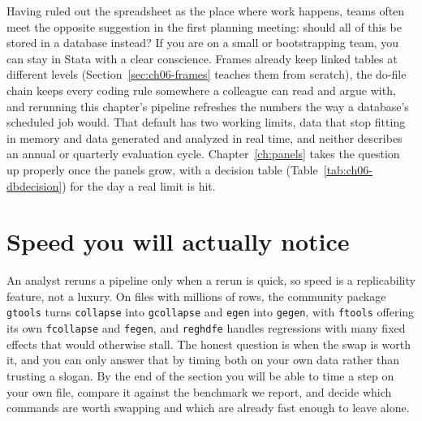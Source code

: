 \documentclass[
    a4paper,
    fontsize=10pt,
    twoside=true,
    numbers=noenddot,
]{kaobook}
\begin{document}
Having ruled out the spreadsheet as the place where work happens, teams often meet the opposite suggestion in the first planning meeting: should all of this be stored in a database instead? If you are on a small or bootstrapping team, you can stay in Stata with a clear conscience. Frames already keep linked tables at different levels (Section~\ref{sec:ch06-frames} teaches them from scratch), the do-file chain keeps every coding rule somewhere a colleague can read and argue with, and rerunning this chapter's pipeline refreshes the numbers the way a database's scheduled job would. That default has two working limits, data that stop fitting in memory and data generated and analyzed in real time, and neither describes an annual or quarterly evaluation cycle. Chapter~\ref{ch:panels} takes the question up properly once the panels grow, with a decision table (Table~\ref{tab:ch06-dbdecision}) for the day a real limit is hit.

\section{Speed you will actually notice}\label{sec:speed}
An analyst reruns a pipeline only when a rerun is quick, so speed is a replicability feature, not a luxury. On files with millions of rows, the community package \texttt{gtools} turns \texttt{collapse} into \texttt{gcollapse} and \texttt{egen} into \texttt{gegen}, with \texttt{ftools} offering its own \texttt{fcollapse} and \texttt{fegen}, and \texttt{reghdfe} handles regressions with many fixed effects that would otherwise stall. The honest question is when the swap is worth it, and you can only answer that by timing both on your own data rather than trusting a slogan. By the end of the section you will be able to time a step on your own file, compare it against the benchmark we report, and decide which commands are worth swapping and which are already fast enough to leave alone.
\end{document}

